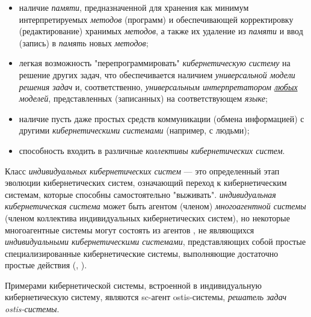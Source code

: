 \begin{itemize}
    \item наличие \textit{памяти}, предназначенной для хранения как минимум интерпретируемых \textit{методов}
	(программ)  и обеспечивающей корректировку (редактирование) хранимых \textit{методов}, а также их удаление  из
	\textit{памяти} и ввод (запись) в \textit{память} новых \textit{методов};
    \item легкая возможность "перепрограммировать"{} \textit{кибернетическую систему} на решение других задач, что
	обеспечивается наличием \textit{универсальной модели решения задач} и, соответственно, \textit{универсальным
	интерпретатором \uline{любых} моделей}, представленных (записанных) на соответствующем \textit{языке};
    \item наличие пусть даже простых средств коммуникации (обмена информацией) с другими \textit{кибернетическими
	системами} (например, с людьми);
    \item способность входить в различные \textit{коллективы кибернетических систем}.
\end{itemize}

Класс \textit{индивидуальных кибернетических систем} — это определенный этап эволюции кибернетических систем,
означающий переход к кибернетическим системам, которые способны самостоятельно "выживать". \textit{индивидуальная
кибернетическая система} может быть агентом (членом) \textit{многоагентной системы} (членом коллектива индивидуальных
кибернетических систем), но некоторые многоагентные системы могут состоять из агентов , не являющихся
\textit{индивидуальными кибернетическими системами}, представляющих собой простые специализированные кибернетические
системы, выполняющие достаточно простые действия (, \scnbigspace {}).

Примерами кибернетической системы, встроенной в индивидуальную кибернетическую систему, являются sc-агент
ostis-системы, \textit{решатель задач ostis-системы}.

